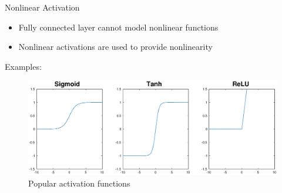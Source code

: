 \documentclass{beamer}
\begin{document}
\begin{frame}{Nonlinear Activation}
    \begin{itemize}
        \item Fully connected layer cannot model nonlinear functions
        \item Nonlinear activations are used to provide nonlinearity
    \end{itemize}
    Examples:   
    \begin{figure}
        \hspace*{-2cm}
        \includegraphics[width=1.33\textwidth]{activations}
        \caption*{Popular activation functions}
    \end{figure}

\end{frame}
\end{document}
